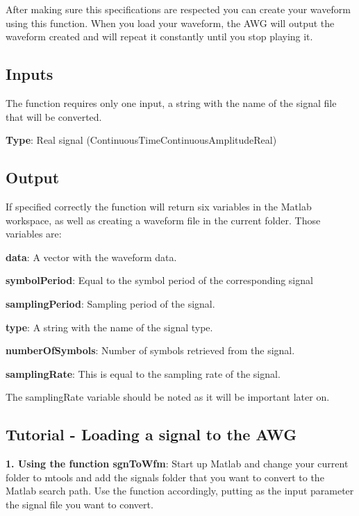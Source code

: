 After making sure this specifications are respected you can create your waveform using this function. When you load your waveform, the AWG will output the waveform created and will repeat it constantly until you stop playing it.


\subsection*{Inputs}

The function requires only one input, a string with the name of the signal file that will be converted. 


\textbf{Type}: Real signal (ContinuousTimeContinuousAmplitudeReal)

\subsection*{Output}

If specified correctly the function will return six variables in the Matlab workspace, as well as creating a waveform file in the current folder.
Those variables are:

\bigskip

\textbf{data}: A vector with the waveform data.
\bigskip

\textbf{symbolPeriod}: Equal to the symbol period of the corresponding signal 
\bigskip

\textbf{samplingPeriod}: Sampling period of the signal.
\bigskip

\textbf{type}: A string with the name of the signal type. 
\bigskip

\textbf{numberOfSymbols}: Number of symbols retrieved from the signal.
\bigskip

\textbf{samplingRate}: This is equal to the sampling rate of the signal.
\bigskip

The samplingRate variable  should be noted as it will be important later on.

\subsection*{Tutorial - Loading a signal to the AWG}

\textbf{1. Using the function sgnToWfm}: 
Start up Matlab and change your current folder to mtools and add the signals folder that you want to convert to the Matlab search path. Use the function accordingly, putting as the input parameter the signal file you want to convert.


